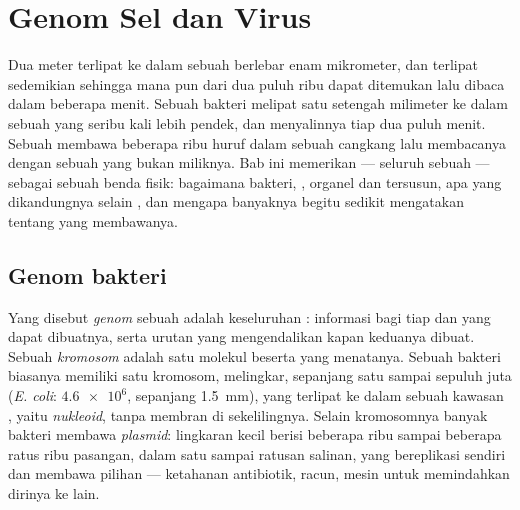 \chapter{Genom Sel dan Virus}\label{ch:b1:genomes}

Dua meter  terlipat ke dalam sebuah  berlebar enam mikrometer,
dan terlipat sedemikian sehingga mana pun dari dua puluh ribu 
dapat ditemukan lalu dibaca dalam beberapa menit. Sebuah bakteri
melipat satu setengah milimeter ke dalam sebuah  yang seribu kali
lebih pendek, dan menyalinnya tiap dua puluh menit. Sebuah 
membawa beberapa ribu huruf dalam sebuah cangkang  lalu
membacanya dengan sebuah  yang bukan miliknya. Bab ini memerikan
\emph{} --- seluruh  sebuah  --- sebagai sebuah benda
fisik: bagaimana  bakteri, , organel dan  tersusun,
apa yang dikandungnya selain , dan mengapa banyaknya begitu sedikit
mengatakan tentang  yang membawanya.

\section{Genom bakteri}

\begin{definition}\label{def:b1:genomes:genome}
Yang disebut \emph{genom} sebuah  adalah keseluruhan
: informasi bagi tiap  dan  yang dapat dibuatnya, serta
urutan yang mengendalikan kapan keduanya dibuat. Sebuah
\emph{kromosom} adalah satu molekul  beserta 
yang menatanya. Sebuah bakteri biasanya memiliki satu kromosom,
melingkar, sepanjang satu sampai sepuluh juta 
(\emph{E. coli}: $\num{4.6e6}$, sepanjang \qty{1.5}{mm}), yang terlipat
ke dalam sebuah kawasan , yaitu \emph{nukleoid},
tanpa membran di sekelilingnya. Selain kromosomnya banyak bakteri
membawa \emph{plasmid}: lingkaran kecil berisi beberapa
ribu sampai beberapa ratus ribu pasangan, dalam satu sampai ratusan
salinan, yang bereplikasi sendiri dan membawa  pilihan --- ketahanan
antibiotik, racun, mesin untuk memindahkan dirinya ke  lain.
\end{definition}

